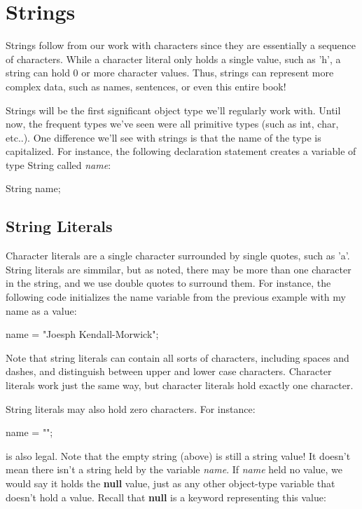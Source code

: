 \section{Strings}

Strings follow from our work with characters since they are essentially a sequence of characters. While a character literal only holds a single value, such as 'h', a string can hold 0 or more character values. Thus, strings can represent more complex data, such as names, sentences, or even this entire book!

Strings will be the first significant object type we'll regularly work with. Until now, the frequent types we've seen were all primitive types (such as int, char, etc..). One difference we'll see with strings is that the name of the type is capitalized. For instance, the following declaration statement creates a variable of type String called \textit{name}:

\begin{code}

String name;

\end{code}

\subsection{String Literals}

Character literals are a single character surrounded by single quotes, such as 'a'. String literals are simmilar, but as noted, there may be more than one character in the string, and we use double quotes to surround them. For instance, the following code initializes the name variable from the previous example with my name as a value:

\begin{code}
name = "Joesph Kendall-Morwick";
\end{code}

Note that string literals can contain all sorts of characters, including spaces and dashes, and distinguish between upper and lower case characters. Character literals work just the same way, but character literals hold exactly one character.

String literals may also hold zero characters. For instance:

\begin{code} 
name = "";
\end{code}

is also legal. Note that the empty string (above) is still a string value! It doesn't mean there isn't a string held by the variable \textit{name}. If \textit{name} held no value, we would say it holds the \textbf{null} value, just as any other object-type variable that doesn't hold a value. Recall that \textbf{null} is a keyword representing this value:

